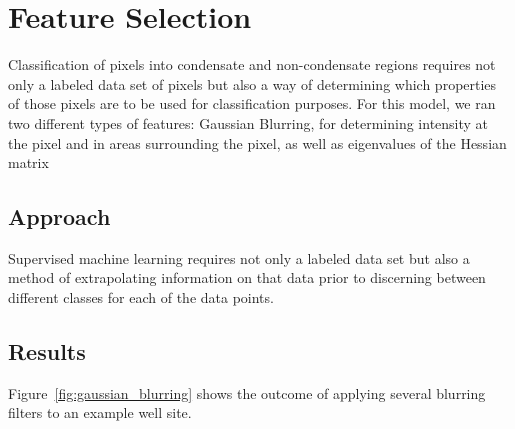 \documentclass[11pt]{article}
\begin{document}
\section{Feature Selection}
Classification of pixels into condensate and non-condensate regions requires not only a labeled data
set of pixels but also a way of determining which properties of those pixels are to be used for
classification purposes. For this model, we ran two different types of features: Gaussian Blurring,
for determining intensity at the pixel and in areas surrounding the pixel, as well as eigenvalues of
the Hessian matrix 

\subsection{Approach}

Supervised machine learning requires not only a labeled data set but also a method of extrapolating
information on that data prior to discerning between different classes for each of the data points. 

\subsection{Results}

Figure~\ref{fig:gaussian_blurring} shows the outcome of applying several blurring filters to an 
example well site.
\end{document}
